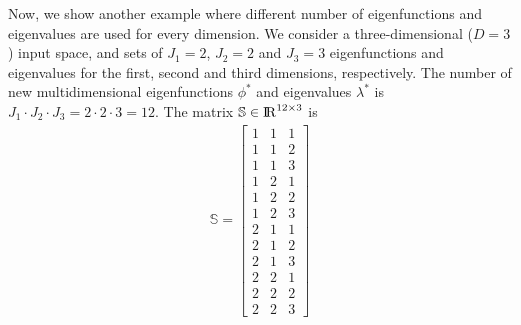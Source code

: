 \documentclass[onecolumn,a4paper,11pt]{article}
\begin{document}
Now, we show another example where different number of eigenfunctions and eigenvalues are used for every dimension. We consider a three-dimensional ($D=3$) input space, and sets of $J_{1}=2$, $J_{2}=2$ and $J_{3}=3$ eigenfunctions and eigenvalues for the first, second and third dimensions, respectively. The number of new multidimensional eigenfunctions $\phi^{\ast}$ and eigenvalues $\lambda^{\ast}$ is $J_{1}\cdot J_{2}\cdot J_{3}=2\cdot 2\cdot 3=12$. The matrix $\mathbb{S}\in {\rm I\!R}^{12 \times 3}$ is
%
\begin{eqnarray}
\mathbb{S}=
\left[ {\begin{array}{ccc}
1 & 1 & 1 \nonumber \\
1 & 1 & 2 \\
1 & 1 & 3 \\
1 & 2 & 1 \\
1 & 2 & 2 \\
1 & 2 & 3 \\
2 & 1 & 1 \\
2 & 1 & 2 \\
2 & 1 & 3 \\
2 & 2 & 1 \\
2 & 2 & 2 \\
2 & 2 & 3 
\end{array} } \right]
\end{eqnarray} 
\end{document}
